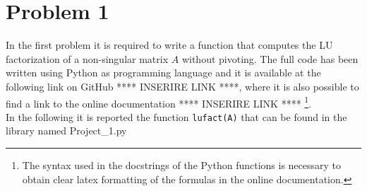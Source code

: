 \documentclass[a4paper,11pt]{report}
\begin{document}
	
\section*{Problem 1}
In the first problem it is required to write a function that computes the LU factorization of a non-singular matrix $A$ without pivoting. The full code has been written using Python as programming language and it is available at the following link on GitHub **** INSERIRE LINK ****, where it is also possible to find a link to the online documentation **** INSERIRE LINK **** \footnote{The syntax used in the docstrings of the Python functions is necessary to obtain clear latex formatting of the formulas in the online documentation.}.\\
In the following it is reported the function \texttt{lufact(A)} that can be found in the library named Project\_1.py
\end{document}
